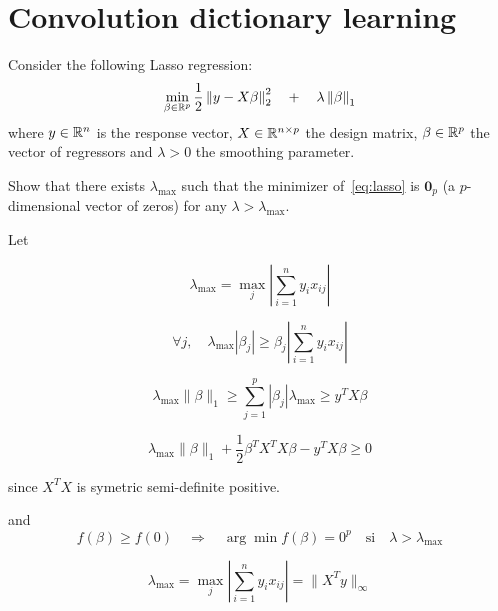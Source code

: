 \documentclass[11pt]{article}
\begin{document}
\section{Convolution dictionary learning}

\begin{exercise}
Consider the following Lasso regression:
\begin{equation}\label{eq:lasso}
    \min_{\beta\in\mathbb{R}^p} \frac{1}{2}\left\lVert y-X\beta\right\rVert^2_2 \quad + \quad \lambda \left\lVert\beta\right\rVert_1
\end{equation}
where $y\in\mathbb{R}^n$ is the response vector, $X\in\mathbb{R}^{n\times p}$ the design matrix, $\beta\in\mathbb{R}^p$ the vector of regressors and $\lambda>0$ the smoothing parameter.

Show that there exists $\lambda_{\max}$ such that the minimizer of~\eqref{eq:lasso} is $\mathbf{0}_p$ (a $p$-dimensional vector of zeros) for any $\lambda > \lambda_{\max}$. 
\end{exercise}

\begin{solution} 

Let

\[
\lambda_{\text{max}} = \max_j \left| \sum_{i=1}^{n} y_i x_{ij} \right|
\]

\[
\forall j, \quad \lambda_{\text{max}} |\beta_j| \geq  \beta_j \left| \sum_{i=1}^{n} y_i x_{ij} \right|
\]

\[
 \lambda_{\text{max}} \|\beta\|_1 \geq  \sum_{j=1}^{p} |\beta_j| \lambda_{\text{max}}  \geq  y^T X \beta 
\]

\[
\lambda_{\text{max}} \|\beta\|_1 + \frac{1}{2} \beta^T X^T X \beta - y^T X \beta \geq 0
\]

since $X^T X$ is symetric semi-definite positive. 

and
\[
f(\beta) \geq f(0)
\quad \Rightarrow \quad \arg \min f(\beta) = 0^p \quad \text{si} \quad \lambda > \lambda_{\text{max}}
\]

\[
\boxed{\lambda_{\text{max}} = \max_j \left| \sum_{i=1}^{n} y_i x_{ij} \right| =  \|X^Ty \|_{\infty} }
\]


\end{solution}
\end{document}
